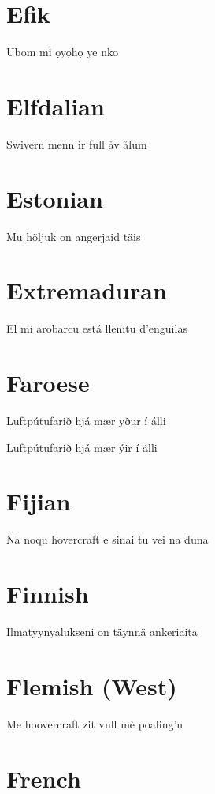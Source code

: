 \documentclass{article}
\begin{document}
\section{Efik}

Ubom mi ọyọhọ ye nko

\section{Elfdalian}

Swivern menn ir full åv ålum

\section{Estonian}

Mu hõljuk on angerjaid täis

\section{Extremaduran}

El mi arobarcu está llenitu d'enguilas

\section{Faroese}

Luftpútufarið hjá mær yður í álli

\noindent
Luftpútufarið hjá mær ýir í álli

\section{Fijian}

Na noqu hovercraft e sinai tu vei na duna

\section{Finnish}

Ilmatyynyalukseni on täynnä ankeriaita

\section{Flemish (West)}

Me hoovercraft zit vull mè poaling'n

\section{French}
\end{document}
